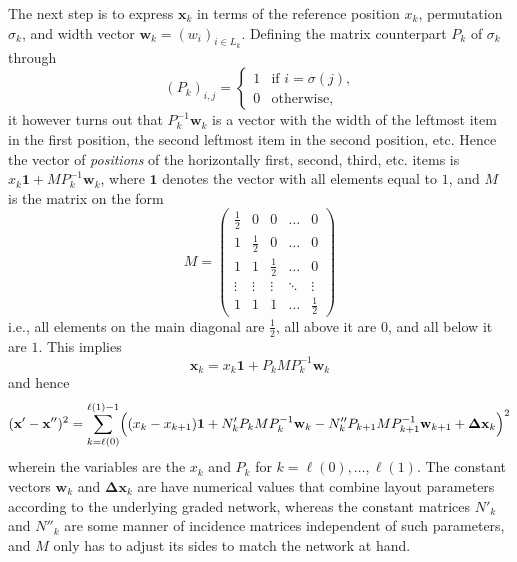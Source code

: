 \documentclass{article}
\newcommand{\vek}{\mathbf}
\theoremstyle{definition}
\begin{document}
The next step is to express $\vek{x}_k$ in terms of the reference 
position $x_k$, permutation $\sigma_k$, and width vector \(\vek{w}_k 
= (w_i)_{i \in L_k}\). Defining the matrix counterpart $P_k$ of 
$\sigma_k$ through
\begin{equation}
  (P_k)_{i,j} = \begin{cases}
    1& \text{if \(i = \sigma(j)\),}\\
    0& \text{otherwise,}
  \end{cases}
\end{equation}
it however turns out that $P_k^{-1} \vek{w}_k$ is a vector with the 
width of the leftmost item in the first position, the second leftmost 
item in the second position, etc. Hence the vector of \emph{positions} 
of the horizontally first, second, third, etc. items is $x_k\vek{1} + 
M P_k^{-1} \vek{w}_k$, where $\vek{1}$ denotes the vector with all 
elements equal to $1$, and $M$ is the matrix on the form
\begin{equation}
  M = \begin{pmatrix}
    \frac{1}{2} & 0 & 0 & \ldots & 0 \\
    1 & \frac{1}{2} & 0 & \ldots & 0 \\
    1 & 1 & \frac{1}{2} & \ldots & 0 \\
    \vdots& \vdots& \vdots& \ddots& \vdots \\
    1 & 1 & 1 & \ldots & \frac{1}{2}
  \end{pmatrix}
\end{equation}
i.e., all elements on the main diagonal are $\frac{1}{2}$, all above 
it are $0$, and all below it are $1$. This implies
\begin{equation}
  \vek{x}_k = x_k \vek{1} + P_k M P_k^{-1} \vek{w}_k
\end{equation}
and hence
\begin{equation} \label{Eq3:Malfunktion}
  (\vek{x}' - \vek{x}'')^2 = \sum_{k=\ell(0)}^{\ell(1)-1} 
  \Bigl( (x_k-x_{k+1})\vek{1} + N'_k P_k M P_k^{-1} \vek{w}_k 
    - N''_k P_{k+1} M P_{k+1}^{-1} \vek{w}_{k+1} + \vek{\Delta x}_k
  \Bigr)^2
\end{equation}
wherein the variables are the $x_k$ and $P_k$ for 
\(k=\ell(0),\dotsc,\ell(1)\). The constant vectors $\vek{w}_k$ and 
$\vek{\Delta x}_k$ are have numerical values that combine layout 
parameters according to the underlying graded network, whereas the 
constant matrices $N'_k$ and $N''_k$ are some manner of incidence 
matrices independent of such parameters, and $M$ only has to adjust 
its sides to match the network at hand.
\end{document}
